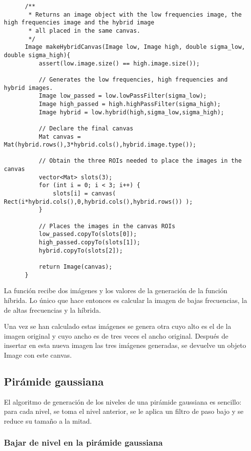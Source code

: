 \documentclass[a4paper, 11pt]{article}
\theoremstyle{definition}
\theoremstyle{theorem}
\begin{document}
  \begin{lstlisting}
      /**
       * Returns an image object with the low frequencies image, the high frequencies image and the hybrid image
       * all placed in the same canvas.
       */
      Image makeHybridCanvas(Image low, Image high, double sigma_low, double sigma_high){
          assert(low.image.size() == high.image.size());

          // Generates the low frequencies, high frequencies and hybrid images.
          Image low_passed = low.lowPassFilter(sigma_low);
          Image high_passed = high.highPassFilter(sigma_high);
          Image hybrid = low.hybrid(high,sigma_low,sigma_high);

          // Declare the final canvas
          Mat canvas = Mat(hybrid.rows(),3*hybrid.cols(),hybrid.image.type());

          // Obtain the three ROIs needed to place the images in the canvas
          vector<Mat> slots(3);
          for (int i = 0; i < 3; i++) {
              slots[i] = canvas( Rect(i*hybrid.cols(),0,hybrid.cols(),hybrid.rows()) );
          }

          // Places the images in the canvas ROIs
          low_passed.copyTo(slots[0]);
          high_passed.copyTo(slots[1]);
          hybrid.copyTo(slots[2]);

          return Image(canvas);
      }
  \end{lstlisting}

  La función recibe dos imágenes y los valores de la generación de la función híbrida. Lo único que hace entonces es calcular la imagen de bajas frecuencias, la de altas frecuencias y la híbrida.

  Una vez se han calculado estas imágenes se genera otra cuyo alto es el de la imagen original y cuyo ancho es de tres veces el ancho original. Después de insertar en esta nueva imagen las tres imágenes generadas, se devuelve un objeto Image con este canvas.

  \subsection{Pirámide gaussiana}
  El algoritmo de generación de los niveles de una pirámide gaussiana es sencillo: para cada nivel, se toma el nivel anterior, se le aplica un filtro de paso bajo y se reduce su tamaño a la mitad.

  \subsubsection*{Bajar de nivel en la pirámide gaussiana}
\end{document}
